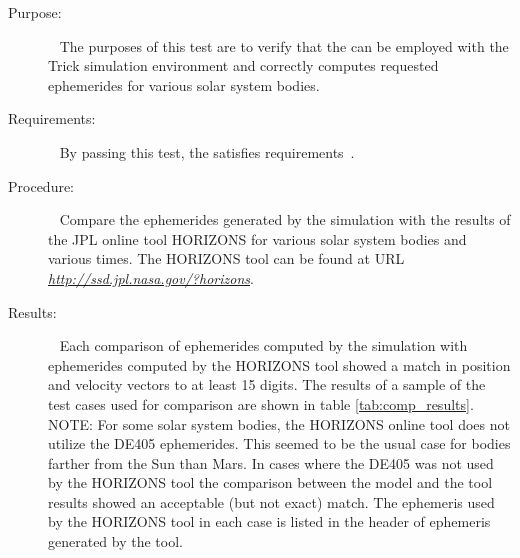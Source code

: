 \label{test:de4xx_sim}
\begin{description}
\item[Purpose:] \ \newline
The purposes of this test are to verify that the \ModelDesc
can be employed with the Trick simulation environment and
correctly computes requested ephemerides for various solar system bodies.
\item[Requirements:] \ \newline
By passing this test, the \ModelDesc satisfies
requirements~.
\item[Procedure:]\ \newline
Compare the ephemerides generated by the simulation 
with the results of the JPL online tool HORIZONS for various solar 
system bodies and various times.  The HORIZONS tool can be found at URL 
\href{ http://ssd.jpl.nasa.gov/?horizons}
{\em http://ssd.jpl.nasa.gov/?horizons}.
\item[Results:]\ \newline
Each comparison of ephemerides computed by the simulation with ephemerides
computed  by the HORIZONS tool showed a match in position and velocity vectors to
at  least 15 digits.  The results of a sample of the test cases used for
comparison  are shown in table \ref{tab:comp_results}.
NOTE: For some solar system bodies, 
the HORIZONS online tool does not utilize the DE405 ephemerides.  This seemed 
to be the usual case for bodies farther from the Sun than Mars.  In cases where 
the DE405 was not used by the HORIZONS tool the comparison between the model 
and the tool results showed an acceptable (but not exact) match. The ephemeris 
used by the HORIZONS tool in each case is listed in the header of ephemeris 
generated by the tool.
\end{description}


